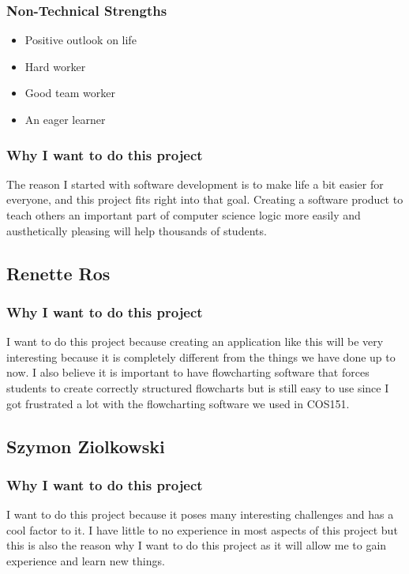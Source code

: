 \subsubsection{Non-Technical Strengths}
\begin{itemize}
	\item{Positive outlook on life}
	\item{Hard worker}
	\item{Good team worker}
	\item{An eager learner}
\end{itemize}
\subsubsection{Why I want to do this project}
The reason I started with software development is to make life a bit easier for everyone, and this project fits right into that goal. Creating a software product to teach others an important part of computer science logic more easily and austhetically pleasing will help thousands of students.

\pagebreak
\subsection{Renette Ros}

\subsubsection{Why I want to do this project}
I want to do this project because creating an application like this will be very interesting because it is completely different from the things we have done up to now. I also believe it is important to have flowcharting software that forces students to create correctly structured flowcharts but is still easy to use since I got frustrated a lot with the flowcharting software we used in COS151.

\pagebreak
\subsection{Szymon Ziolkowski}

\subsubsection{Why I want to do this project} 
I want to do this project because it poses many interesting challenges and has a cool factor to it. I have little to no experience in most aspects of this project but this is also the reason why I want to do this project as it will allow me to gain experience and learn new things.  

